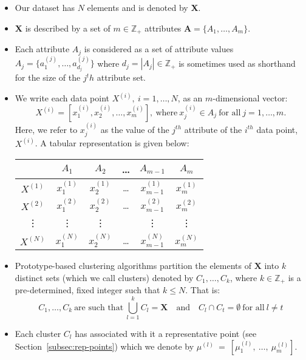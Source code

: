 \begin{itemize}
    \item Our dataset has \(N\) elements and is denoted by \textbf{X}.
    \item \textbf{X} is described by a set of \(m \in \mathbb{Z}_+\) attributes 
        \(\textbf{A} = \{A_1, \ldots, A_m\}\).
    \item Each attribute \(A_j\) is considered as a set of attribute values 
        \(A_j = \{a_1^{(j)}, \ldots, a_{d_j}^{(j)}\}\) where \(d_j = |A_j| \in 
        \mathbb{Z}_+\) is sometimes used as shorthand for the size of the 
        \(j^th\) attribute set.
    \item We write each data point \(X^{(i)}, \ i = 1, \ldots, N\), as an 
        \(m\)-dimensional vector:
	    \[
		    X^{(i)} = \left[x_1^{(i)}, x_2^{(i)}, \ldots, x_m^{(i)}\right], \
            \text{where} \ x_j^{(i)} \in A_j \ \text{for all} \ j = 1, \ldots, 
            m.
	    \]
        Here, we refer to \(x_j^{(i)}\) as the value of the \(j^{th}\) attribute
        of the \(i^{th}\) data point, \(X^{(i)}\). A tabular representation is 
        given below:
        \begin{table}[h]
        \centering
        \begin{tabular}{cccccc}
            {} & \(A_1\) & \(A_2\) & \quad \ldots \quad & \(A_{m-1}\) & \(A_m\)
            \\
            \midrule
            \(X^{(1)}\) & \(x_1^{(1)}\) & \(x_2^{(1)}\) & \quad \ldots \quad & 
            \(x_{m-1}^{(1)}\) & \(x_m^{(1)}\)
            \\
            \(X^{(2)}\) & \(x_1^{(2)}\) & \(x_2^{(2)}\) & \quad \ldots \quad &
            \(x_{m-1}^{(2)}\) & \(x_m^{(2)}\)
            \\
            \vdots & \vdots & \vdots & {} & \vdots & \vdots
            \\
            \(X^{(N)}\) & \(x_1^{(N)}\) & \(x_2^{(N)}\) & \quad \ldots \quad &
            \(x_{m-1}^{(N)}\) & \(x_m^{(N)}\)
            \\
        \end{tabular}
        \end{table}
	\item Prototype-based clustering algorithms partition the elements of 
        \(\textbf{X}\) into \(k\) distinct sets (which we call clusters) denoted
        by \(C_1, \ldots, C_k\), where \(k \in \mathbb{Z}_+\) is a 
        pre-determined, fixed integer such that \(k \le N\). That is:
	    \[
		    C_1, \ldots, C_k \ \text{are such that} \ \bigcup_{l=1}^k C_l = 
		    \textbf{X} \quad \text{and} \quad C_l \cap C_t = \emptyset \
		    \text{for all} \ l \neq t
	    \]
    \item Each cluster \(C_l\) has associated with it a representative point 
		(see Section~\ref{subsec:rep-points}) which we denote by 
        \(\mu^{(l)}~=~\left[\mu_1^{(l)},~\ldots,~\mu_m^{(l)}\right]\).
\end{itemize}


